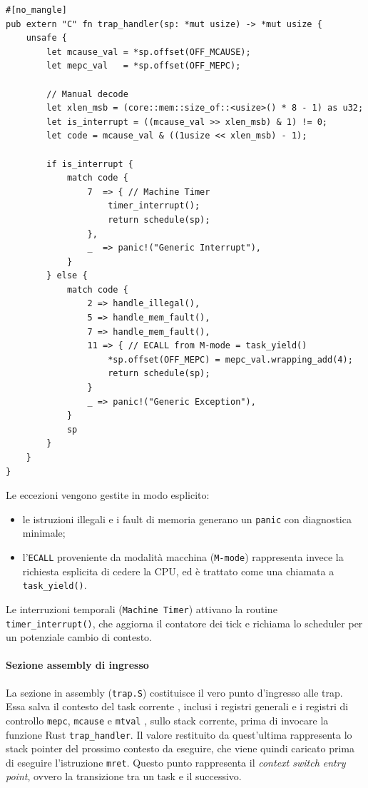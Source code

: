 \documentclass[italian, Lau, oneside]{sapthesis} %
\begin{document}
\begin{center}
\begin{verbatim}
#[no_mangle]
pub extern "C" fn trap_handler(sp: *mut usize) -> *mut usize {
    unsafe {
        let mcause_val = *sp.offset(OFF_MCAUSE);
        let mepc_val   = *sp.offset(OFF_MEPC);

        // Manual decode
        let xlen_msb = (core::mem::size_of::<usize>() * 8 - 1) as u32;
        let is_interrupt = ((mcause_val >> xlen_msb) & 1) != 0;
        let code = mcause_val & ((1usize << xlen_msb) - 1);

        if is_interrupt {
            match code {
                7  => { // Machine Timer
                    timer_interrupt();
                    return schedule(sp);
                },
                _  => panic!("Generic Interrupt"),
            }
        } else {
            match code {
                2 => handle_illegal(),
                5 => handle_mem_fault(),
                7 => handle_mem_fault(),
                11 => { // ECALL from M-mode = task_yield()
                    *sp.offset(OFF_MEPC) = mepc_val.wrapping_add(4);
                    return schedule(sp);
                }
                _ => panic!("Generic Exception"),
            }
            sp
        }
    }
}
\end{verbatim}
\end{center}

Le eccezioni vengono gestite in modo esplicito:

\begin{itemize}
    \item le istruzioni illegali e i fault di memoria generano un \texttt{panic} con diagnostica minimale;  
    \item  l’\texttt{ECALL} proveniente da modalità macchina (\texttt{M-mode}) rappresenta invece la richiesta esplicita di cedere la CPU, ed è trattato come una chiamata a \texttt{task\_yield()}.
\end{itemize}

Le interruzioni temporali (\texttt{Machine Timer}) attivano la routine \texttt{timer\_interrupt()}, che aggiorna il contatore dei tick e richiama lo scheduler per un potenziale cambio di contesto.

\paragraph{Sezione assembly di ingresso}
La sezione in assembly (\texttt{trap.S}) costituisce il vero punto d’ingresso alle trap.  
Essa salva il contesto del task corrente , inclusi i registri generali e i registri di controllo \texttt{mepc}, \texttt{mcause} e \texttt{mtval} , sullo stack corrente, prima di invocare la funzione Rust \texttt{trap\_handler}.  
Il valore restituito da quest’ultima rappresenta lo stack pointer del prossimo contesto da eseguire, che viene quindi caricato prima di eseguire l’istruzione \texttt{mret}.  
Questo punto rappresenta il \emph{context switch entry point}, ovvero la transizione tra un task e il successivo.
\end{document}
